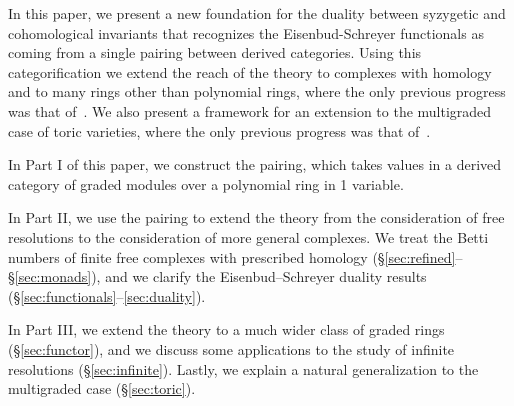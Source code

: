 \documentclass[12pt]{amsart}
\theoremstyle{definition}
\theoremstyle{remark}
\def\BS{Boij--S\"oderberg~}
\begin{document}
In this paper, we present a new foundation for the duality between syzygetic and cohomological invariants that recognizes the Eisenbud-Schreyer functionals as coming
from a single pairing between derived categories.
Using this categorification we  extend the reach of the theory to complexes with homology and to many rings other than polynomial rings, where the only previous progress was that of~\cite{bbeg}. We also present a framework for an extension to the multigraded case of toric varieties, where the only previous progress was that of~\cites{boij-floystad,floystad-multigraded}.




In Part I of this paper, 
we construct the pairing, which takes values in a derived category of graded modules over a polynomial ring in 1 variable.


In Part II, we use the pairing to extend the theory from the consideration of free resolutions to the consideration of more general complexes.
We treat the Betti numbers of finite free complexes with prescribed homology  (\S\ref{sec:refined}--\S\ref{sec:monads}), and we clarify the Eisenbud--Schreyer duality results (\S\ref{sec:functionals}--\ref{sec:duality}).  

In Part III, we extend the theory to a much wider class of graded rings (\S\ref{sec:functor}), and we discuss some applications to the study of infinite resolutions (\S\ref{sec:infinite}).  Lastly, we explain a natural generalization to the multigraded case (\S\ref{sec:toric}).

\end{document}
